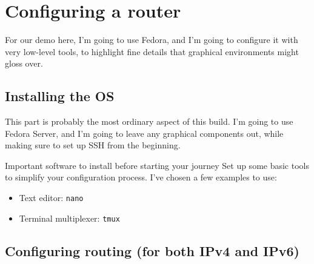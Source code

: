 \documentclass[bigger]{beamer}
\begin{document}
\section{Configuring a router}
\label{sec:org2055775}
For our demo here, I'm going to use Fedora, and I'm going to configure it with
very low-level tools, to highlight fine details that graphical environments
might gloss over.

\subsection{Installing the OS}
\label{sec:orgfdf5a5f}
This part is probably the most ordinary aspect of this build. I'm going to use
Fedora Server, and I'm going to leave any graphical components out, while
making sure to set up SSH from the beginning.

\begin{frame}[fragile,label={sec:org98c7403}]{Important software to install before starting your journey}
  Set up some basic tools to simplify your configuration process. I've chosen a few examples to use:
  \begin{itemize}
  \item<2-> Text editor: \texttt{nano}

  \item<3-> Terminal multiplexer: \texttt{tmux}
  \end{itemize}
\end{frame}

\subsection{Configuring routing (for both IPv4 and IPv6)}
\label{sec:org5b3a27e}
\end{document}
